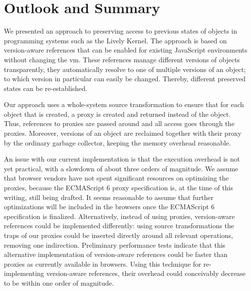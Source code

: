\section{Outlook and Summary} \label{chapter:SUMMARY} \label{chapter:FUTURE_WORK}

We presented an approach to preserving access to previous states of objects in programming systems such as the Lively Kernel.
The approach is based on version-aware references that can be enabled for existing JavaScript environments without changing the \ac{vm}\@.
These references manage different versions of objects transparently, \ie they automatically resolve to one of multiple versions of an object; to which version in particular can easily be changed.
Thereby, different preserved states can be re-established.

Our approach uses a whole-system source transformation to ensure that for each object that is created, a proxy is created and returned instead of the object.
Thus, references to proxies are passed around and all access goes through the proxies.
Moreover, versions of an object are reclaimed together with their proxy by the ordinary garbage collector, keeping the memory overhead reasonable.

An issue with our current implementation is that the execution
overhead is not yet practical, with a slowdown of about three orders
of magnitude.  We assume that browser vendors have not spent
significant resources on optimizing the proxies, because the
ECMAScript 6 proxy specification is, at the time of this writing,
still being drafted.  It seems reasonable to assume that further
optimizations will be included in the browsers once the ECMAScript 6
specification is finalized.  Alternatively, instead of using proxies,
version-aware references could be implemented differently: using
source transformations the traps of our proxies could be inserted
directly around all relevant operations, removing one indirection.
Preliminary performance tests indicate that this alternative
implementation of version-aware references could be faster than
proxies as currently available in browsers. Using this technique for
re-implementing version-aware references, their overhead could
conceivably decrease to be within one order of magnitude.


